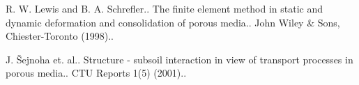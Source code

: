 
\begin{thebibliography}{10}

\bibitem{[1]}
{\sc R. W.  Lewis and B. A. Schrefler.}. {The finite element method in static and dynamic deformation and consolidation of porous media.}. John Wiley \& Sons, Chiester-Toronto (1998)..



\bibitem{[2]}
{\sc J. \v{S}ejnoha et. al.}. {Structure - subsoil interaction in view of transport processes in porous media.}. CTU Reports 1(5) (2001)..

\end{thebibliography}
